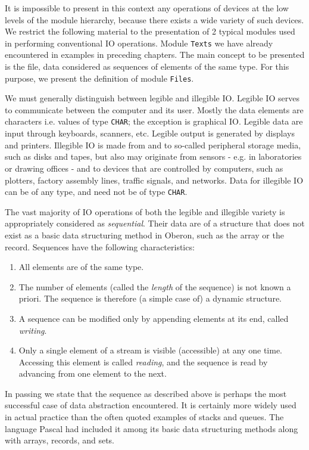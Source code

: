 It is impossible to present in this context any operations of devices at the low levels of
the module hierarchy, because there exists a wide variety of such devices. We restrict the
following material to the presentation of 2 typical modules used in performing conventional
IO operations. Module \verb|Texts| we have already encountered in examples in preceding
chapters. The main concept to be presented is the file, data considered as sequences of
elements of the same type. For this purpose, we present the definition of module \verb|Files|.

We must generally distinguish between legible and illegible IO. Legible IO serves to
communicate between the computer and its user. Mostly the data elements are characters i.e.
values of type \verb|CHAR|; the exception is graphical IO. Legible data are input through
keyboards, scanners, etc. Legible output is generated by displays and printers. Illegible
IO is made from and to so-called peripheral storage media, such as disks and tapes, but
also may originate from sensors - e.g. in laboratories or drawing offices - and to devices
that are controlled by computers, such as plotters, factory assembly lines, traffic signals,
and networks. Data for illegible IO can be of any type, and need not be of type \verb|CHAR|.

The vast majority of IO operations of both the legible and illegible variety is appropriately
considered as \emph{sequential}. Their data are of a structure that does not exist as a
basic data structuring method in Oberon, such as the array or the record. Sequences have
the following characteristics:
\begin{enumerate}
  \item All elements are of the same type.
  \item The number of elements (called the \emph{length} of the sequence) is not known a
    priori. The sequence is therefore (a simple case of) a dynamic structure.
  \item A sequence can be modified only by appending elements at its end, called \emph{writing}.
  \item Only a single element of a stream is visible (accessible) at any one time. Accessing
    this element is called \emph{reading}, and the sequence is read by advancing from one
    element to the next.
\end{enumerate}
In passing we state that the sequence as described above is perhaps the most successful
case of data abstraction encountered. It is certainly more widely used in actual practice
than the often quoted examples of stacks and queues. The language Pascal had included it
among its basic data structuring methods along with arrays, records, and sets.

